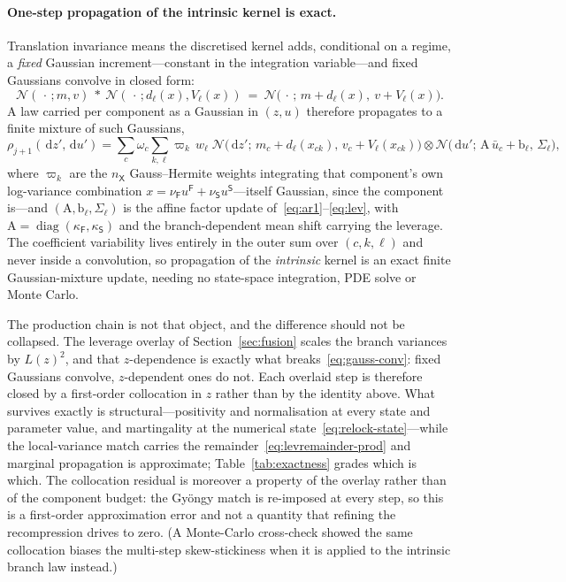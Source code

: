 \documentclass[11pt]{article}
\newcommand{\cN}{\mathcal{N}}
\providecommand{\1}{\mathbf 1}
\newcommand{\dd}{\,\mathrm{d}}
\begin{document}
\paragraph{One-step propagation of the intrinsic kernel is exact.} Translation invariance means the discretised kernel
adds, conditional on a regime, a \emph{fixed} Gaussian increment---constant in the integration
variable---and fixed Gaussians convolve in closed form:
\begin{equation}
\cN(\,\cdot\,;m,v)\ \ast\ \cN(\,\cdot\,;d_{\ell}(x),V_{\ell}(x))
\ =\ \cN\!\big(\,\cdot\,;\,m+d_{\ell}(x),\ v+V_{\ell}(x)\big).
\label{eq:gauss-conv}
\end{equation}
A law carried per component as a Gaussian in $(z,u)$ therefore propagates to a finite mixture of
such Gaussians,
\begin{equation}
\rho_{j+1}(\dd z',\dd u')=\sum_{c}\omega_c\sum_{k,\ell}\varpi_k\,w_\ell\;
\cN\!\big(\dd z';\,m_c+d_{\ell}(x_{ck}),\,v_c+V_{\ell}(x_{ck})\big)\otimes
\cN\!\big(\dd u';\,\mathrm A\,\bar u_{c}+\mathrm b_\ell,\,\Sigma_\ell\big),
\label{eq:gm-closure}
\end{equation}
where $\varpi_k$ are the $n_{\mathsf X}$ Gauss--Hermite weights integrating that component's own
log-variance combination $x=\nu_{\mathsf F}u^{\mathsf F}+\nu_{\mathsf S}u^{\mathsf S}$---itself
Gaussian, since the component is---and $(\mathrm A,\mathrm b_\ell,\Sigma_\ell)$ is the affine
factor update of~\eqref{eq:ar1}--\eqref{eq:lev}, with $\mathrm A=\operatorname{diag}
(\kappa_{\mathsf F},\kappa_{\mathsf S})$ and the branch-dependent mean shift carrying the leverage.
The coefficient variability lives entirely in the outer sum over $(c,k,\ell)$ and never inside a
convolution, so propagation of the \emph{intrinsic} kernel is an exact finite Gaussian-mixture
update, needing no state-space integration, PDE solve or Monte Carlo.

The production chain is not that object, and the difference should not be collapsed. The leverage
overlay of Section~\ref{sec:fusion} scales the branch variances by $L(z)^2$, and that $z$-dependence
is exactly what breaks~\eqref{eq:gauss-conv}: fixed Gaussians convolve, $z$-dependent ones do not.
Each overlaid step is therefore closed by a first-order collocation in $z$ rather than by the
identity above. What survives exactly is structural---positivity and normalisation at every state
and parameter value, and martingality at the numerical state~\eqref{eq:relock-state}---while the
local-variance match carries the remainder~\eqref{eq:levremainder-prod} and marginal propagation is
approximate; Table~\ref{tab:exactness} grades which is which. The collocation residual is moreover a property of
the overlay rather than of the component budget: the Gy\"ongy match is re-imposed at every step, so
this is a first-order approximation error and not a quantity that refining the recompression drives
to zero. (A Monte-Carlo cross-check showed the same collocation biases the multi-step
skew-stickiness when it is applied to the intrinsic branch law instead.)
\end{document}
